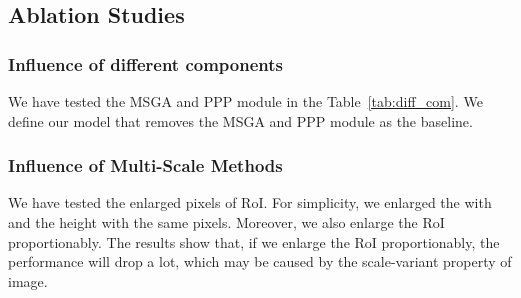 \documentclass[journal]{IEEEtran}
\begin{document}
\begin{table}[]
	\centering
	\caption{Effects of Probabilistic Post Processing}
	\label{tab:ppp module}
\end{table}
	
	\subsection{Ablation Studies}
	\subsubsection{Influence of different components}
	We have tested the MSGA and PPP module in the Table~\ref{tab:diff_com}. We define our model that removes the MSGA and PPP module as the baseline.
	
	
	\subsubsection{Influence of Multi-Scale Methods}
	We have tested the enlarged pixels of RoI. For simplicity, we enlarged the with and the height with the same pixels. Moreover, we also enlarge the RoI proportionably. The results show that, if we enlarge the RoI proportionably, the performance will drop a lot, which may be caused by the scale-variant property of image.
	
\end{document}
